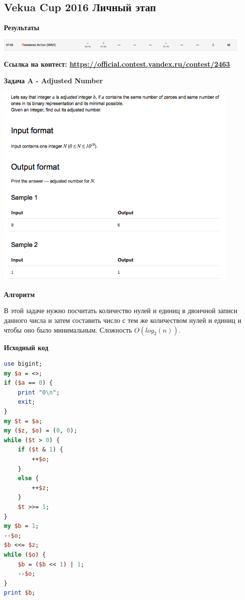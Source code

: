 \documentclass[a4paper,12pt]{article}
\begin{document}
\subsection{Vekua Cup 2016 Личный этап}

\textbf{{\large Результаты}} \\
\begin{center}
\includegraphics[width=0.95\textwidth]{Vekua_2016_Anton/result.png}\\ [1cm]
\end{center}

\textbf{{\large Ссылка на контест: \url{https://official.contest.yandex.ru/contest/2463}}}

\newpage
\textbf{{\large Задача A - Adjusted Number}}

\begin{center}
\includegraphics[width=0.9\textwidth]{Vekua_2016_Anton/A.png}\\ [1cm]
\end{center}

\textbf{{\large Алгоритм}}

В этой задаче нужно посчитать количество нулей и единиц в двоичной записи данного числа и затем составить число с тем же количеством нулей и единиц и чтобы оно было минимальным. Сложность $O(log_2(n))$. \\

\newpage

\textbf{{\large Исходный код}} \\
\begin{lstlisting}[language=Perl]
use bigint;
my $a = <>;
if ($a == 0) {
	print "0\n";
	exit;
}
my $t = $a;
my ($z, $o) = (0, 0);
while ($t > 0) {
	if ($t & 1) {
		++$o;
	}
	else {
		++$z;
	}
	$t >>= 1;
}
my $b = 1;
--$o;
$b <<= $z;
while ($o) {
	$b = ($b << 1) | 1;
	--$o;
}
print $b;
\end{lstlisting}
\end{document}
